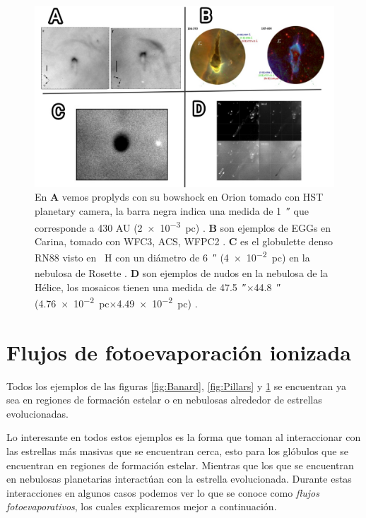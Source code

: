 \documentclass{book}
\begin{document}
\begin{figure}[h]
    \centering
    \includegraphics[width=1 \textwidth]{images Chapter 1/C1_Globulettes.jpg}
    \caption{En \textbf{A} vemos proplyds con su bowshock en Orion tomado con HST planetary camera, la barra negra indica una medida de \SI{1}{\arcsecond} que corresponde a 430 AU (\SI{2e-3}{pc}) \citep{Garcia-Arredondo:2001}. \textbf{B} son ejemplos de EGGs en Carina, tomado con WFC3, ACS, WFPC2 \citep{Mesa-Delgado:2016}. \textbf{C} es el globulette denso RN88 visto en \SI{}{H_\alpha} con un diámetro de \SI{6}{\arcsecond} (\SI{4e-2}{pc}) en la nebulosa de Rosette \citep{GFGahm:2013}. \textbf{D} son ejemplos de nudos en la nebulosa de la Hélice, los mosaicos tienen una medida de \SI{47.5}{\arcsecond}$\times$\SI{44.8}{\arcsecond} (\SI{4.76e-2}{pc}$\times$\SI{4.49e-2}{pc}) \citep{O'Dell:2007}. }
    \label{fig:nudos}
\end{figure}



\section{Flujos de fotoevaporación ionizada} \label{Sec:fluijos fotoevaporativos}

Todos los ejemplos de las figuras \ref{fig:Banard}, \ref{fig:Pillars} y \ref{fig:nudos} se encuentran ya sea en regiones de formación estelar o en nebulosas alrededor de estrellas evolucionadas. 

Lo interesante en todos estos ejemplos es la forma que toman al interaccionar con las estrellas más masivas que se encuentran cerca, esto para los glóbulos que se encuentran en regiones de formación estelar.  Mientras que los que se encuentran en nebulosas planetarias interactúan con la estrella evolucionada. Durante estas interacciones en algunos casos podemos ver lo que se conoce como \textit{flujos fotoevaporativos}, los cuales explicaremos mejor a continuación.
\end{document}
